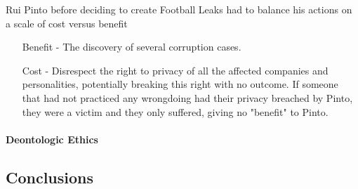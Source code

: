     Rui Pinto before deciding to create Football Leaks had to balance his actions on a scale of cost versus benefit
    \begin{enumerate}
        \item [Benefit] - The discovery of several corruption cases.
        \item [Cost] - Disrespect the right to privacy of all the affected companies and personalities, potentially breaking this right with no outcome.
        If someone that had not practiced any wrongdoing had their privacy breached by Pinto, they were a victim and they only suffered, giving no "benefit" to Pinto.
    \end{enumerate}

%    
%
\paragraph{Deontologic Ethics}

\subsection{Conclusions}



    